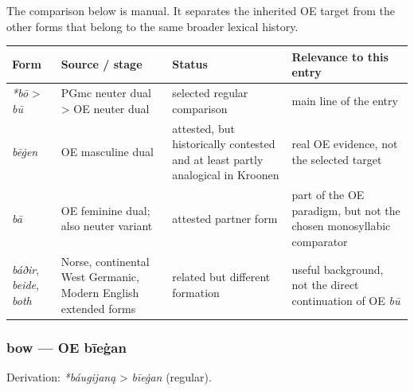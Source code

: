 \documentclass[
  british,
  a4paper,
]{article}
\newcounter{none} %
\begin{document}
The comparison below is manual. It separates the inherited OE target
from the other forms that belong to the same broader lexical history.

{\def\LTcaptype{none} %
\begin{longtable}[]{@{}
  >{\raggedright\arraybackslash}p{}
  >{\raggedright\arraybackslash}p{}
  >{\raggedright\arraybackslash}p{}
  >{\raggedright\arraybackslash}p{}@{}}
\toprule\noalign{}
\begin{minipage}[b]{\linewidth}\raggedright
Form
\end{minipage} & \begin{minipage}[b]{\linewidth}\raggedright
Source / stage
\end{minipage} & \begin{minipage}[b]{\linewidth}\raggedright
Status
\end{minipage} & \begin{minipage}[b]{\linewidth}\raggedright
Relevance to this entry
\end{minipage} \\
\midrule\noalign{}
\endhead
\bottomrule\noalign{}
\endlastfoot
\emph{*bō} \textgreater{} \emph{bū} & PGmc neuter dual \textgreater{} OE
neuter dual & selected regular comparison & main line of the entry \\
\emph{bēġen} & OE masculine dual & attested, but historically contested
and at least partly analogical in Kroonen & real OE evidence, not the
selected target \\
\emph{bā} & OE feminine dual; also neuter variant & attested partner
form & part of the OE paradigm, but not the chosen monosyllabic
comparator \\
\emph{báðir}, \emph{beide}, \emph{both} & Norse, continental West
Germanic, Modern English extended forms & related but different
formation & useful background, not the direct continuation of OE
\emph{bū} \\
\end{longtable}
}

\subsubsection{bow --- OE bīeġan}\label{bow-oe-bux12beux121an-1}

Derivation: \emph{*báugijaną} \textgreater{} \emph{bīeġan} (regular).
\end{document}
